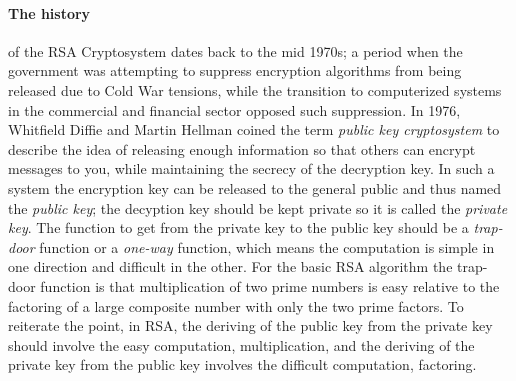 \documentclass[12pt]{article}
\begin{document}
\paragraph{The history} of the RSA Cryptosystem dates back to the mid 1970s; a period when the government was attempting to suppress encryption algorithms  from being released due to Cold War tensions, while the transition to computerized systems in the commercial and financial sector opposed such suppression.  In 1976, Whitfield Diffie and Martin Hellman coined the term \textit{public key cryptosystem} to describe the idea of releasing enough information so that others can encrypt messages to you, while maintaining the secrecy of the decryption key.  In such a system the encryption key can be released to the general public and thus named the \textit{public key}; the decyption key should be kept private so it is called the \textit{private key}.  The function to get from the private key to the public key should be a \textit{trap-door} function or a \textit{one-way} function, which means the computation is simple in one direction and difficult in the other.  For the basic RSA algorithm the trap-door function is that multiplication of two prime numbers is easy relative to the factoring of a large composite number with only the two prime factors.  To reiterate the point, in RSA, the deriving of the public key from the private key should involve the easy computation, multiplication, and the deriving of the private key from the public key involves the difficult computation, factoring.
\end{document}
